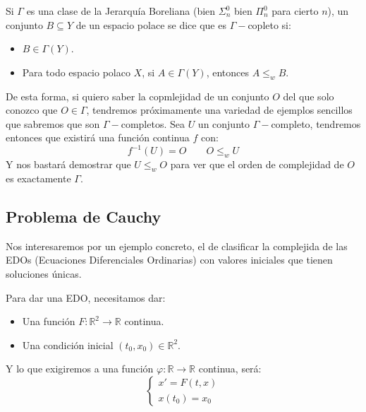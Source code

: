 \begin{definicion}
    Si $\Gamma$ es una clase de la Jerarquía Boreliana (bien $\Sigma^0_n$ bien $\Pi^0_n$ para cierto $n$), un conjunto $B\subseteq Y$ de un espacio polace se dice que es $\Gamma-$copleto si:
    \begin{itemize}
        \item $B\in \Gamma(Y)$.
        \item Para todo espacio polaco $X$, si $A\in \Gamma(Y)$, entonces $A\leq_w B$.
    \end{itemize}
\end{definicion}

De esta forma, si quiero saber la copmlejidad de un conjunto $O$ del que solo conozco que $O\in \Gamma$, tendremos próximamente una variedad de ejemplos sencillos que sabremos que son $\Gamma-$completos. Sea $U$ un conjunto $\Gamma-$completo, tendremos entonces que existirá una función continua $f$ con:
\begin{equation*}
    f^{-1}(U) = O \qquad O\leq_w U
\end{equation*}
Y nos bastará demostrar que $U\leq_w O$ para ver que el orden de complejidad de $O$ es exactamente $\Gamma$.

\subsection{Problema de Cauchy}
Nos interesaremos por un ejemplo concreto, el de clasificar la complejida de las EDOs (Ecuaciones Diferenciales Ordinarias) con valores iniciales que tienen soluciones únicas.

Para dar una EDO, necesitamos dar:
\begin{itemize}
    \item Una función $F:\mathbb{R}^2\to \mathbb{R}$ continua.
    \item Una condición inicial $(t_0,x_0)\in \mathbb{R}^2$.
\end{itemize}
Y lo que exigiremos a una función $\varphi:\mathbb{R}\to \mathbb{R}$ continua, será:
\begin{equation*}
    \left\{\begin{array}{c}
        x' = F(t,x) \\
        x(t_0) = x_0
    \end{array}\right.
\end{equation*}

